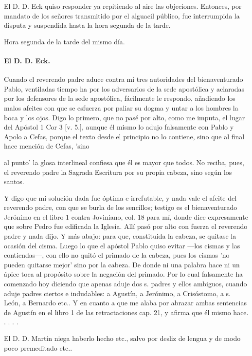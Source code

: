 El D. D. Eck quiso responder ya repitiendo al aire las objeciones. Entonces, por mandato de los señores transmitido por el alguacil público, fue interrumpida la disputa y suspendida hasta la hora segunda de la tarde.

Hora segunda de la tarde del mismo día.

\paragraph*{El D. D. Eck.}

Cuando el reverendo padre aduce contra mí tres autoridades del bienaventurado Pablo, ventiladas tiempo ha por los adversarios de la sede apostólica y aclaradas por los defensores de la sede apostólica, fácilmente le respondo, añadiendo los malos afeites con que se esfuerza por paliar su dogma y untar a los hombres la boca y los ojos. Digo lo primero, que no pasé por alto, como me imputa, el lugar del Apóstol 1 Cor 3 [v. 5.], aunque él mismo lo adujo falsamente con Pablo y Apolo a Cefas, porque el texto desde el principio no lo contiene, sino que al final hace mención de Cefas, 'sino

al punto' la glosa interlineal confiesa que él es mayor que todos. No reciba, pues, el reverendo padre la Sagrada Escritura por su propia cabeza, sino según los santos.

Y digo que mi solución dada fue óptima e irrefutable, y nada vale el afeite del reverendo padre, con que se burla de los sencillos; testigo es el bienaventurado Jerónimo en el libro 1 contra Joviniano, col. 18 para mí, donde dice expresamente que sobre Pedro fue edificada la Iglesia. Allí pasó por alto con fuerza el reverendo padre y nada dijo. Y más abajo: para que, constituida la cabeza, se quitase \marginpar{\small[305]} la ocasión del cisma. Luego lo que el apóstol Pablo quiso evitar —los cismas y las contiendas—, con ello no quitó el primado de la cabeza, pues los cismas 'no pueden quitarse mejor' sino por la cabeza. De donde ni una palabra hace ni un ápice toca al propósito sobre la negación del primado. Por lo cual falsamente ha comenzado hoy diciendo que apenas aduje dos s. padres y ellos ambiguos, cuando aduje padres ciertos e indudables: a Agustín, a Jerónimo, a Crisóstomo, a s. León, a Bernardo etc.. Y en cuanto a que me alaba por abrazar ambas sentencias de Agustín en el libro 1 de las retractaciones cap. 21, y afirma que él mismo hace. . . . .

El D. D. Martín niega haberlo hecho etc., salvo por desliz de lengua y de modo poco premeditado etc..

